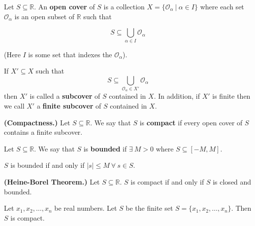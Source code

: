 \begin{definition} Let \(S \subseteq \mathbb{R}\). An \textbf{open cover} of \(S\) is a collection \(X = \{\mathcal{O}_\alpha \ | \ \alpha \in I \} \) where each set \(\mathcal{O}_\alpha\) is an open subset of \(\mathbb{R}\) such that

\[
S \subseteq \bigcup_{\alpha \in I} \mathcal{O}_\alpha
\]

(Here \(I\) is some set that indexes the \(\mathcal{O}_\alpha\)).

\end{definition}

\begin{definition} If \(X' \subseteq X\) such that \[S \subseteq  \bigcup_{\mathcal{O}_\alpha \in X'} \mathcal{O}_\alpha\]then \(X'\) is called a \textbf{subcover} of \(S\) contained in \(X\). In addition, if \(X'\) is finite then we call \(X'\) a \textbf{finite subcover} of \(S\) contained in \(X\).

\end{definition}

\begin{definition} \textbf{(Compactness.)} Let \(S \subseteq \mathbb{R}\). We say that \(S\) is \textbf{compact} if every open cover of \(S\) contains a finite subcover. 

\end{definition}

\begin{definition} Let \(S \subseteq \mathbb{R}\). We say that \(S\) is \textbf{bounded} if \(\exists \ M > 0\) where \(S \subseteq [-M, M]\).

\end{definition}

\begin{remark} \(S\) is bounded if and only if \(|s| \leq M\  \forall \ s \in S \).

\end{remark}

\begin{theorem}\label{ra.heine-borel.thm} \textbf{(Heine-Borel Theorem.)} Let \(S \subseteq \mathbb{R}\). \(S\) is compact if and only if \(S\) is closed and bounded.

\end{theorem}

\begin{proposition}\label{ra.hw6.1} Let \(x_1, x_2, \ldots, x_n\) be real numbers. Let \(S\) be the finite set \(S = \{x_1, x_2, \ldots, x_n\}\). Then \(S\) is compact.\end{proposition}

